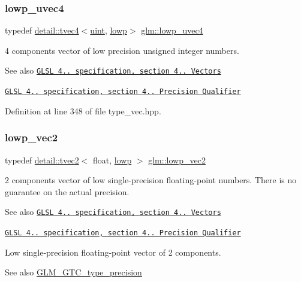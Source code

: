 \subsubsection{\texorpdfstring{lowp\+\_\+uvec4}{lowp\_uvec4}}
{\footnotesize\ttfamily typedef \hyperlink{structglm_1_1detail_1_1tvec4}{detail\+::tvec4}$<$\hyperlink{group__core__precision_ga4fd29415871152bfb5abd588334147c8}{uint}, \hyperlink{namespaceglm_a0f04f086094c747d227af4425893f545ae161af3fc695e696ce3bf69f7332bc2d}{lowp}$>$ \hyperlink{group__core__precision_ga17b5f652e5c64b0034065420d844fca7}{glm\+::lowp\+\_\+uvec4}}

4 components vector of low precision unsigned integer numbers.

\begin{DoxySeeAlso}{See also}
\href{http://www.opengl.org/registry/doc/GLSLangSpec.4.20.8.pdf}{\tt G\+L\+SL 4.. specification, section 4.. Vectors} 

\href{http://www.opengl.org/registry/doc/GLSLangSpec.4.20.8.pdf}{\tt G\+L\+SL 4.. specification, section 4.. Precision Qualifier} 
\end{DoxySeeAlso}


Definition at line 348 of file type\+\_\+vec.\+hpp.

\mbox{\label{group__core__precision_gac63d79532b7e8d18f579ebe63e4fde49}} 
\subsubsection{\texorpdfstring{lowp\+\_\+vec2}{lowp\_vec2}}
{\footnotesize\ttfamily typedef \hyperlink{structglm_1_1detail_1_1tvec2}{detail\+::tvec2}$<$ float, \hyperlink{namespaceglm_a0f04f086094c747d227af4425893f545ae161af3fc695e696ce3bf69f7332bc2d}{lowp} $>$ \hyperlink{group__core__precision_gac63d79532b7e8d18f579ebe63e4fde49}{glm\+::lowp\+\_\+vec2}}

2 components vector of low single-\/precision floating-\/point numbers. There is no guarantee on the actual precision.

\begin{DoxySeeAlso}{See also}
\href{http://www.opengl.org/registry/doc/GLSLangSpec.4.20.8.pdf}{\tt G\+L\+SL 4.. specification, section 4.. Vectors} 

\href{http://www.opengl.org/registry/doc/GLSLangSpec.4.20.8.pdf}{\tt G\+L\+SL 4.. specification, section 4.. Precision Qualifier}
\end{DoxySeeAlso}
Low single-\/precision floating-\/point vector of 2 components. \begin{DoxySeeAlso}{See also}
\hyperlink{group__gtc__type__precision}{G\+L\+M\+\_\+\+G\+T\+C\+\_\+type\+\_\+precision} 
\end{DoxySeeAlso}


